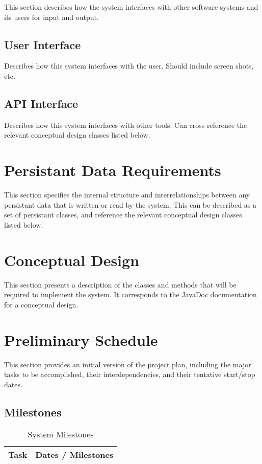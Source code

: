 This section describes how the system interfaces with other software
systems and its users for input and output.

\subsection{User Interface}
Describes how this system interfaces with the user. Should include screen
shots, etc.

\subsection{API Interface}
Describes how this system interfaces with other tools. Can cross reference
the relevant conceptual design classes listed below.

\section{Persistant Data Requirements}

This section specifies the internal structure and interrelationships
between any persistant data that is written or read by the system. This can
be described as a set of persistant classes, and reference the relevant
conceptual design classes listed below.

\section{Conceptual Design}

This section presents a description of the classes and methods that will be
required to implement the system. It corresponds to the JavaDoc
documentation for a conceptual design.

\section{Preliminary Schedule}

This section provides an initial version of the project plan, including the
major tasks to be accomplished, their interdependencies, and their
tentative start/stop dates.

\subsection{Milestones}
\begin{table}[htbp]
  \caption{System Milestones}
  
  \begin{center}
    \begin{tabular}{|l|l|}\hline
      {\bf Task}&{\bf Dates / Milestones}\\ \hline \hline
    \end{tabular}
  \end{center}
\end{table}


